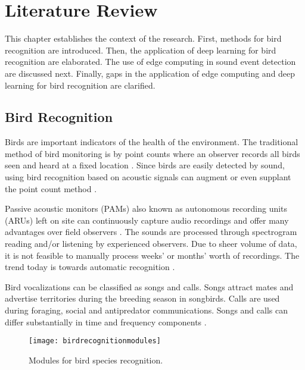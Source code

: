 

\chapter{Literature Review}

This chapter establishes the context of the research. First, methods for bird recognition are introduced. 
Then, the application of deep learning for bird recognition are elaborated.
The use of edge computing in sound event detection are discussed next.
Finally, gaps in the application of edge computing and deep learning for bird recognition are clarified.

\section{Bird Recognition}


Birds are important indicators of the health of the environment. 
The traditional method of bird monitoring is by point counts where an observer records all birds seen and heard at a fixed location \cite{Shonfield2017}.
Since birds are easily detected by sound, using bird recognition based on acoustic signals can augment or even supplant the point count method \citep{Kuaga2019}.

Passive acoustic monitors (PAMs) also known as autonomous recording units (ARUs) left on site can continuously capture audio recordings and offer many advantages over field observers \citep{Digby2013,Sugai2019}.
The sounds are processed through spectrogram reading and/or listening by experienced observers.
Due to sheer volume of data, it is not feasible to manually process weeks' or months’ worth of recordings.
The trend today is towards automatic recognition \citep{Aide2013}.

Bird vocalizations can be classified as songs and calls. Songs attract mates and advertise territories during the breeding season in songbirds. Calls are used during foraging, social and antipredator communications. Songs and calls can differ substantially in time and frequency components \cite{Velez2015}.

\begin{figure}%
\centering
\texttt{[image: birdrecognitionmodules]}
\caption{Modules for bird species recognition.}
\label{birdrecognitionmodules}
\end{figure}

